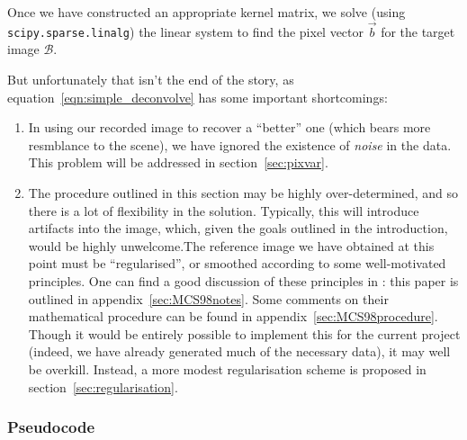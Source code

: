 \documentclass[letterpaper, 11pt]{article}
\begin{document}
Once we have constructed an appropriate kernel matrix, we solve (using \texttt{scipy.sparse.linalg}) the linear system to find the pixel vector $\vec b$ for the target image $\mathcal B$.

But unfortunately that isn't the end of the story, as equation~\ref{eqn:simple_deconvolve} has some important shortcomings:

\begin{enumerate}
	\item In using our recorded image to recover a ``better'' one (which bears more resmblance to the scene), we have ignored the existence of \emph{noise} in the data. This problem will be addressed in section~\vref{sec:pixvar}.
	
	\item The procedure outlined in this section may be highly over-determined, and so there is a lot of flexibility in the solution. Typically, this will introduce artifacts into the image, which, given the goals outlined in the introduction, would be highly unwelcome.\newline The reference image we have obtained at this point must be ``regularised'', or smoothed according to some well-motivated principles. One can find a good discussion of these principles in \citet{MCS98}: this paper is outlined in appendix~\ref{sec:MCS98notes}. Some comments on their mathematical procedure can be found in appendix~\ref{sec:MCS98procedure}. \newline Though it would be entirely possible to implement this for the current project (indeed, we have already generated much of the necessary data), it may well be overkill. Instead, a more modest regularisation scheme is proposed in section~\ref{sec:regularisation}.
\end{enumerate}



\subsubsection{Pseudocode}
\end{document}
